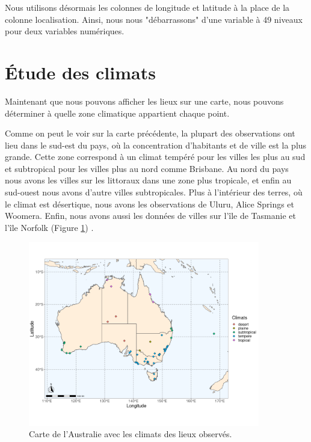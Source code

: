 \documentclass{article}
\begin{document}
Nous utilisons désormais les colonnes de longitude et latitude à la place de la colonne localisation. Ainsi, nous nous "débarrassons" d'une variable à 49 niveaux pour deux variables numériques.  

\section{Étude des climats}

Maintenant que nous pouvons afficher les lieux sur une carte, nous pouvons déterminer à quelle zone climatique appartient chaque point.

Comme on peut le voir sur la carte précédente, la plupart des observations ont lieu dans le sud-est du pays, où la concentration d'habitants et de ville est la plus grande. Cette zone correspond à un climat tempéré pour les villes les plus au sud et subtropical pour les villes plus au nord comme Brisbane. Au nord du pays nous avons les villes sur les littoraux dans une zone plus tropicale, et enfin au sud-ouest nous avons d'autre villes subtropicales. Plus à l'intérieur des terres, où le climat est désertique, nous avons les observations de Uluru, Alice Springs et Woomera. Enfin, nous avons aussi les données de villes sur l'île de Tasmanie et l'île Norfolk (Figure \ref{fig:carte_climats}) \cite{frwiki:190163125}. 

\begin{figure}[htp]
    \centering
    \includegraphics[width=0.9\textwidth]{Images/Cartographie/Australia_climates.png}
    \caption{Carte de l'Australie avec les climats des lieux observés.}
    \label{fig:carte_climats}
\end{figure}
\end{document}
